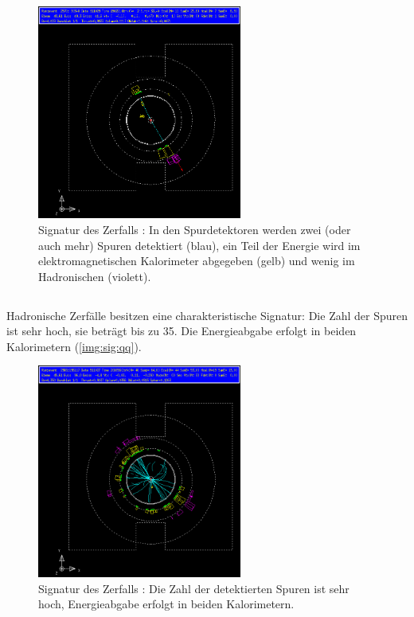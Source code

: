 \begin{figure}[H]
\begin{center}
  \includegraphics[width=0.6\textwidth]{../img/gropepics/tt1b.png}
  \caption{Signatur des Zerfalls \Ztt: In den Spurdetektoren werden zwei (oder auch mehr)
  Spuren detektiert (blau),
  ein Teil der Energie wird im elektromagnetischen Kalorimeter abgegeben (gelb) und wenig im Hadronischen (violett).}
  \label{img:sig:tt}
\end{center}
\end{figure} 

\subsection*{\Zqq}
Hadronische Zerfälle  besitzen eine charakteristische Signatur:
Die Zahl der Spuren ist sehr hoch, sie beträgt bis zu 35.
Die Energieabgabe erfolgt in beiden Kalorimetern (\autoref{img:sig:qq}).

\begin{figure}[H]
\begin{center}
  \includegraphics[width=0.6\textwidth]{../img/gropepics/qq1b.png}
  \caption{Signatur des Zerfalls \Zqq: Die Zahl der detektierten Spuren ist sehr hoch,
  Energieabgabe erfolgt in beiden Kalorimetern.}
  \label{img:sig:qq}
\end{center}
\end{figure} 